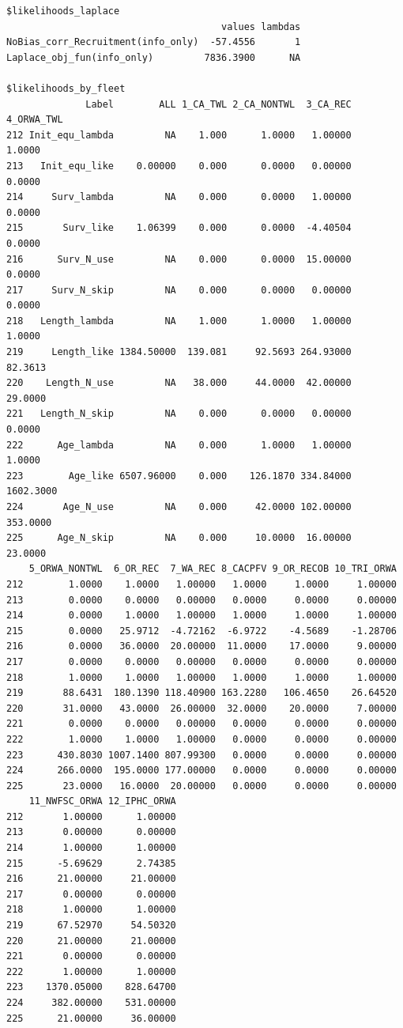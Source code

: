 \documentclass[
]{scrartcl}
\begin{document}
\begin{verbatim}
$likelihoods_laplace
                                      values lambdas
NoBias_corr_Recruitment(info_only)  -57.4556       1
Laplace_obj_fun(info_only)         7836.3900      NA

$likelihoods_by_fleet
              Label        ALL 1_CA_TWL 2_CA_NONTWL  3_CA_REC 4_ORWA_TWL
212 Init_equ_lambda         NA    1.000      1.0000   1.00000     1.0000
213   Init_equ_like    0.00000    0.000      0.0000   0.00000     0.0000
214     Surv_lambda         NA    0.000      0.0000   1.00000     0.0000
215       Surv_like    1.06399    0.000      0.0000  -4.40504     0.0000
216      Surv_N_use         NA    0.000      0.0000  15.00000     0.0000
217     Surv_N_skip         NA    0.000      0.0000   0.00000     0.0000
218   Length_lambda         NA    1.000      1.0000   1.00000     1.0000
219     Length_like 1384.50000  139.081     92.5693 264.93000    82.3613
220    Length_N_use         NA   38.000     44.0000  42.00000    29.0000
221   Length_N_skip         NA    0.000      0.0000   0.00000     0.0000
222      Age_lambda         NA    0.000      1.0000   1.00000     1.0000
223        Age_like 6507.96000    0.000    126.1870 334.84000  1602.3000
224       Age_N_use         NA    0.000     42.0000 102.00000   353.0000
225      Age_N_skip         NA    0.000     10.0000  16.00000    23.0000
    5_ORWA_NONTWL  6_OR_REC  7_WA_REC 8_CACPFV 9_OR_RECOB 10_TRI_ORWA
212        1.0000    1.0000   1.00000   1.0000     1.0000     1.00000
213        0.0000    0.0000   0.00000   0.0000     0.0000     0.00000
214        0.0000    1.0000   1.00000   1.0000     1.0000     1.00000
215        0.0000   25.9712  -4.72162  -6.9722    -4.5689    -1.28706
216        0.0000   36.0000  20.00000  11.0000    17.0000     9.00000
217        0.0000    0.0000   0.00000   0.0000     0.0000     0.00000
218        1.0000    1.0000   1.00000   1.0000     1.0000     1.00000
219       88.6431  180.1390 118.40900 163.2280   106.4650    26.64520
220       31.0000   43.0000  26.00000  32.0000    20.0000     7.00000
221        0.0000    0.0000   0.00000   0.0000     0.0000     0.00000
222        1.0000    1.0000   1.00000   0.0000     0.0000     0.00000
223      430.8030 1007.1400 807.99300   0.0000     0.0000     0.00000
224      266.0000  195.0000 177.00000   0.0000     0.0000     0.00000
225       23.0000   16.0000  20.00000   0.0000     0.0000     0.00000
    11_NWFSC_ORWA 12_IPHC_ORWA
212       1.00000      1.00000
213       0.00000      0.00000
214       1.00000      1.00000
215      -5.69629      2.74385
216      21.00000     21.00000
217       0.00000      0.00000
218       1.00000      1.00000
219      67.52970     54.50320
220      21.00000     21.00000
221       0.00000      0.00000
222       1.00000      1.00000
223    1370.05000    828.64700
224     382.00000    531.00000
225      21.00000     36.00000


\end{verbatim}
\end{document}
